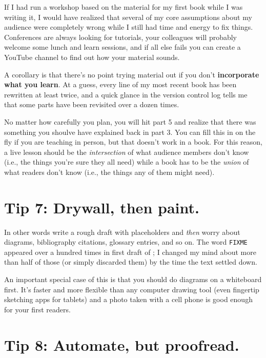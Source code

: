 \documentclass[10pt,letterpaper]{article}
\begin{document}
If I had run a workshop based on the material for my first book
while I was writing it,
I would have realized that several of my core assumptions about my audience were completely wrong
while I still had time and energy to fix things.
Conferences are always looking for tutorials,
your colleagues will probably welcome some lunch and learn sessions,
and if all else fails you can create a YouTube channel
to find out how your material sounds.

A corollary is that
there's no point trying material out if you don't \textbf{incorporate what you learn}.
At a guess,
every line of my most recent book has been rewritten at least twice,
and a quick glance in the version control log tells me that
some parts have been revisited over a dozen times.

\begin{mdframed}

  No matter how carefully you plan,
  you will hit part 5 and realize that
  there was something you shoulve have explained back in part 3.
  You can fill this in on the fly if you are teaching in person,
  but that doesn't work in a book.
  For this reason,
  a live lesson should be the \emph{intersection} of what audience members don't know
  (i.e., the things you're sure they all need)
  while a book has to be the \emph{union} of what readers don't know
  (i.e., the things any of them might need).

\end{mdframed}

\section*{Tip 7: Drywall, then paint.}

In other words write a rough draft with placeholders
and \emph{then} worry about diagrams, bibliography citations, glossary entries, and so on.
The word \texttt{FIXME} appeared over a hundred times in first draft of \cite{Wi2022};
I changed my mind about more than half of those (or simply discarded them)
by the time the text settled down.

An important special case of this is that you should do diagrams on a whiteboard first.
It's faster and more flexible than any computer drawing tool
(even fingertip sketching apps for tablets)
and a photo taken with a cell phone is good enough for your first readers.

\section*{Tip 8: Automate, but proofread.}
\end{document}
